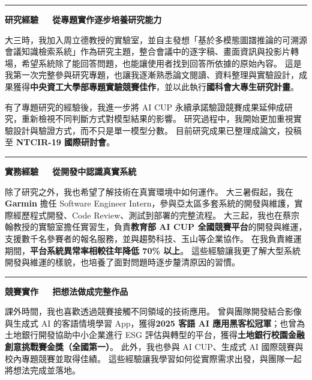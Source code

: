 \documentclass[10.5pt,a4paper]{article}
\newcommand{\cjktitlefont}{}
\newcommand{\sechead}[2]{%
  {\color{bluemed}\rule{3.6pt}{15pt}}\hspace{7pt}%
  {\cjktitlefont\bfseries\fontsize{14}{16}\selectfont\color{bluemed}#1}%
  {\fontsize{13}{16}\selectfont\color{bluemed}\ \textbar\ }%
  {\cjktitlefont\bfseries\fontsize{13}{16}\selectfont\color{bluemed}#2}\par
}
\newcommand{\secbody}[1]{%
  \vspace{5pt}
  {\color{ink}\fontsize{10.3}{16.5}\selectfont #1\par}
}
\begin{document}
\begin{tcolorbox}[
  enhanced,
  breakable,
  frame hidden,
  colback=secbg,
  colframe=secbg,
  boxrule=0pt,
  arc=2pt,
  grow to left by=26pt,
  grow to right by=26pt,
  left=26pt,
  right=26pt,
  top=12pt,
  bottom=12pt,
  boxsep=0pt
]

\sechead{研究經驗}{從專題實作逐步培養研究能力}

\secbody{
大三時，我加入周立德教授的實驗室，並自主發想「基於多模態圖譜推論的可溯源會議知識檢索系統」作為研究主題，整合會議中的逐字稿、畫面資訊與投影片轉場，希望系統除了能回答問題，也能讓使用者找到回答所依據的原始內容。
這是我第一次完整參與研究專題，也讓我逐漸熟悉論文閱讀、資料整理與實驗設計，成果獲得\textbf{中央資工大學部專題實驗競賽佳作}，並以此執行\textbf{國科會大專生研究計畫}。
}

\vspace{6pt}

\secbody{
有了專題研究的經驗後，我進一步將 AI CUP 永續承諾驗證競賽成果延伸成研究，重新檢視不同判斷方式對模型結果的影響。
研究過程中，我開始更加重視實驗設計與驗證方式，而不只是單一模型分數。
目前研究成果已整理成論文，投稿至\textbf{ NTCIR-19 國際研討會}。
}

\end{tcolorbox}

\vspace{11pt}



\sechead{實務經驗}{從開發中認識真實系統}

\secbody{
除了研究之外，我也希望了解技術在真實環境中如何運作。
大三暑假起，我在 \textbf{Garmin} 擔任 Software Engineer Intern，參與亞太區多套系統的開發與維護，實際經歷程式開發、Code Review、測試到部署的完整流程。
大三起，我也在蔡宗翰教授的實驗室擔任實習生，負責\textbf{教育部 AI CUP 全國競賽平台}的開發與維運，支援數千名參賽者的報名服務，並與趨勢科技、玉山等企業協作。
在我負責維運期間，\textbf{平台系統異常率相較往年降低 70\% 以上}。
這些經驗讓我更了解大型系統開發與維運的樣貌，也培養了面對問題時逐步釐清原因的習慣。
}

\vspace{11pt}



\begin{tcolorbox}[
  enhanced,
  breakable,
  frame hidden,
  colback=secbg,
  colframe=secbg,
  boxrule=0pt,
  arc=2pt,
  grow to left by=26pt,
  grow to right by=26pt,
  left=26pt,
  right=26pt,
  top=12pt,
  bottom=12pt,
  boxsep=0pt
]

\sechead{競賽實作}{把想法做成完整作品}

\secbody{
課外時間，我也喜歡透過競賽接觸不同領域的技術應用。
曾與團隊開發結合影像與生成式 AI 的客語情境學習 App，獲得\textbf{2025 客語 AI 應用黑客松冠軍}；也曾為土地銀行開發協助中小企業進行 ESG 評估與轉型的平台，獲得\textbf{土地銀行校園金融創意挑戰賽金獎（全國第一）}。
此外，我也參與 AI CUP、生成式 AI 國際競賽與校內專題競賽並取得佳績。
這些經驗讓我學習如何從實際需求出發，與團隊一起將想法完成並落地。
}

\end{tcolorbox}
\end{document}
